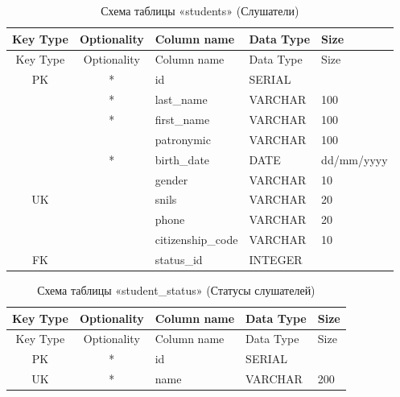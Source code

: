 \begin{xltabular}{\textwidth}{|c|c|l|l|X|}
	\caption{Схема таблицы «students» (Слушатели)\label{tab:students}}\\ \hline
	\centrow Key Type & \centrow Optionality & \centrow Column name & \centrow Data Type & \centrow Size \\ \hline
	\endfirsthead
	\centrow Key Type & \centrow Optionality & \centrow Column name & \centrow Data Type & \centrow Size \\ \hline
	\finishhead
	PK & * & id & SERIAL & \\ \hline
	& * & last\_name & VARCHAR & 100 \\ \hline
	& * & first\_name & VARCHAR & 100 \\ \hline
	& & patronymic & VARCHAR & 100 \\ \hline
	& * & birth\_date & DATE & dd/mm/yyyy \\ \hline
	& & gender & VARCHAR & 10 \\ \hline
	UK & & snils & VARCHAR & 20 \\ \hline
	& & phone & VARCHAR & 20 \\ \hline
	& & citizenship\_code & VARCHAR & 10 \\ \hline
	FK & & status\_id & INTEGER & \\ \hline
\end{xltabular}

\begin{xltabular}{\textwidth}{|c|c|l|l|X|}
	\caption{Схема таблицы «student\_status» (Статусы слушателей)\label{tab:student_status}}\\ \hline
	\centrow Key Type & \centrow Optionality & \centrow Column name & \centrow Data Type & \centrow Size \\ \hline
	\endfirsthead
	\centrow Key Type & \centrow Optionality & \centrow Column name & \centrow Data Type & \centrow Size \\ \hline
	\finishhead
	PK & * & id & SERIAL & \\ \hline
	UK & * & name & VARCHAR & 200 \\ \hline
\end{xltabular}

